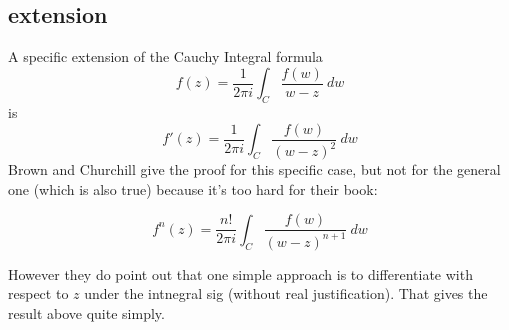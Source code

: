 \documentclass[11pt, oneside]{article}
\begin{document}
\subsection*{extension}
A specific extension of the Cauchy Integral formula 
\[ f(z) = \frac{1}{2 \pi i} \int_C \frac{f(w)}{w - z} \ dw \]
is
\[ f'(z) = \frac{1}{2 \pi i} \int_C \frac{f(w)}{(w - z)^2} \ dw \]
Brown and Churchill give the proof for this specific case, but not for the general one (which is also true) because it's too hard for their book:

\[ f^n(z) = \frac{n!}{2 \pi i} \int_C \frac{f(w)}{(w - z)^{n+1}} \ dw \]

However they do point out that one simple approach is to differentiate with respect to $z$ under the intnegral sig (without real justification).  That gives the result above quite simply.
\end{document}

